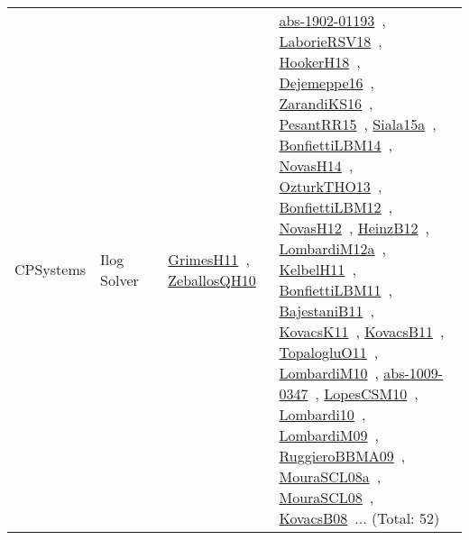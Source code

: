 {\begin{longtable}{lp{3cm}>{\raggedright\arraybackslash}p{6cm}>{\raggedright\arraybackslash}p{6cm}>{\raggedright\arraybackslash}p{8cm}}
CPSystems & Ilog Solver &  & \href{works/GrimesH11.pdf}{GrimesH11}~\cite{GrimesH11}, \href{works/ZeballosQH10.pdf}{ZeballosQH10}~\cite{ZeballosQH10} & \href{works/abs-1902-01193.pdf}{abs-1902-01193}~\cite{abs-1902-01193}, \href{works/LaborieRSV18.pdf}{LaborieRSV18}~\cite{LaborieRSV18}, \href{works/HookerH18.pdf}{HookerH18}~\cite{HookerH18}, \href{works/Dejemeppe16.pdf}{Dejemeppe16}~\cite{Dejemeppe16}, \href{works/ZarandiKS16.pdf}{ZarandiKS16}~\cite{ZarandiKS16}, \href{works/PesantRR15.pdf}{PesantRR15}~\cite{PesantRR15}, \href{works/Siala15a.pdf}{Siala15a}~\cite{Siala15a}, \href{works/BonfiettiLBM14.pdf}{BonfiettiLBM14}~\cite{BonfiettiLBM14}, \href{works/NovasH14.pdf}{NovasH14}~\cite{NovasH14}, \href{works/OzturkTHO13.pdf}{OzturkTHO13}~\cite{OzturkTHO13}, \href{works/BonfiettiLBM12.pdf}{BonfiettiLBM12}~\cite{BonfiettiLBM12}, \href{works/NovasH12.pdf}{NovasH12}~\cite{NovasH12}, \href{works/HeinzB12.pdf}{HeinzB12}~\cite{HeinzB12}, \href{works/LombardiM12a.pdf}{LombardiM12a}~\cite{LombardiM12a}, \href{works/KelbelH11.pdf}{KelbelH11}~\cite{KelbelH11}, \href{works/BonfiettiLBM11.pdf}{BonfiettiLBM11}~\cite{BonfiettiLBM11}, \href{works/BajestaniB11.pdf}{BajestaniB11}~\cite{BajestaniB11}, \href{works/KovacsK11.pdf}{KovacsK11}~\cite{KovacsK11}, \href{works/KovacsB11.pdf}{KovacsB11}~\cite{KovacsB11}, \href{works/TopalogluO11.pdf}{TopalogluO11}~\cite{TopalogluO11}, \href{works/LombardiM10.pdf}{LombardiM10}~\cite{LombardiM10}, \href{works/abs-1009-0347.pdf}{abs-1009-0347}~\cite{abs-1009-0347}, \href{works/LopesCSM10.pdf}{LopesCSM10}~\cite{LopesCSM10}, \href{works/Lombardi10.pdf}{Lombardi10}~\cite{Lombardi10}, \href{works/LombardiM09.pdf}{LombardiM09}~\cite{LombardiM09}, \href{works/RuggieroBBMA09.pdf}{RuggieroBBMA09}~\cite{RuggieroBBMA09}, \href{works/MouraSCL08a.pdf}{MouraSCL08a}~\cite{MouraSCL08a}, \href{works/MouraSCL08.pdf}{MouraSCL08}~\cite{MouraSCL08}, \href{works/KovacsB08.pdf}{KovacsB08}~\cite{KovacsB08}... (Total: 52)\\

\end{longtable}}
